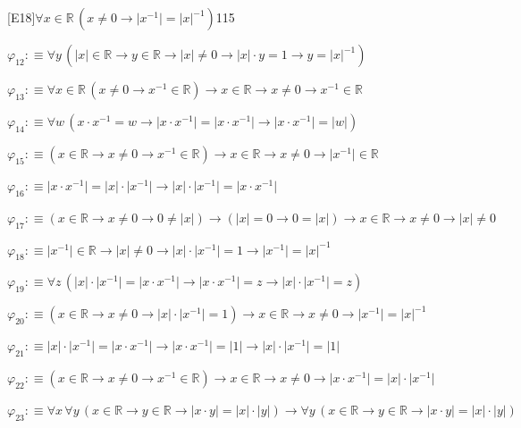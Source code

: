 \begin{fullproof}{[E18]}{$\forall x \in \mathbb{R}\,(x \neq 0 \to \lvert x^{-1} \rvert = \lvert x \rvert^{-1})$}{115}
\begin{abbrevlist}
\item $\varphi_{12} :\equiv \forall y\,(\lvert x \rvert \in \mathbb{R} \to y \in \mathbb{R} \to \lvert x \rvert \neq 0 \to \lvert x \rvert \cdot y = 1 \to y = \lvert x \rvert^{-1})$
\item $\varphi_{13} :\equiv \forall x \in \mathbb{R}\,(x \neq 0 \to x^{-1} \in \mathbb{R}) \to x \in \mathbb{R} \to x \neq 0 \to x^{-1} \in \mathbb{R}$
\item $\varphi_{14} :\equiv \forall w\,(x \cdot x^{-1} = w \to \lvert x \cdot x^{-1} \rvert = \lvert x \cdot x^{-1} \rvert \to \lvert x \cdot x^{-1} \rvert = \lvert w \rvert)$
\item $\varphi_{15} :\equiv (x \in \mathbb{R} \to x \neq 0 \to x^{-1} \in \mathbb{R}) \to x \in \mathbb{R} \to x \neq 0 \to \lvert x^{-1} \rvert \in \mathbb{R}$
\item $\varphi_{16} :\equiv \lvert x \cdot x^{-1} \rvert = \lvert x \rvert \cdot \lvert x^{-1} \rvert \to \lvert x \rvert \cdot \lvert x^{-1} \rvert = \lvert x \cdot x^{-1} \rvert$
\item $\varphi_{17} :\equiv (x \in \mathbb{R} \to x \neq 0 \to 0 \neq \lvert x \rvert) \to (\lvert x \rvert = 0 \to 0 = \lvert x \rvert) \to x \in \mathbb{R} \to x \neq 0 \to \lvert x \rvert \neq 0$
\item $\varphi_{18} :\equiv \lvert x^{-1} \rvert \in \mathbb{R} \to \lvert x \rvert \neq 0 \to \lvert x \rvert \cdot \lvert x^{-1} \rvert = 1 \to \lvert x^{-1} \rvert = \lvert x \rvert^{-1}$
\item $\varphi_{19} :\equiv \forall z\,(\lvert x \rvert \cdot \lvert x^{-1} \rvert = \lvert x \cdot x^{-1} \rvert \to \lvert x \cdot x^{-1} \rvert = z \to \lvert x \rvert \cdot \lvert x^{-1} \rvert = z)$
\item $\varphi_{20} :\equiv (x \in \mathbb{R} \to x \neq 0 \to \lvert x \rvert \cdot \lvert x^{-1} \rvert = 1) \to x \in \mathbb{R} \to x \neq 0 \to \lvert x^{-1} \rvert = \lvert x \rvert^{-1}$
\item $\varphi_{21} :\equiv \lvert x \rvert \cdot \lvert x^{-1} \rvert = \lvert x \cdot x^{-1} \rvert \to \lvert x \cdot x^{-1} \rvert = \lvert 1 \rvert \to \lvert x \rvert \cdot \lvert x^{-1} \rvert = \lvert 1 \rvert$
\item $\varphi_{22} :\equiv (x \in \mathbb{R} \to x \neq 0 \to x^{-1} \in \mathbb{R}) \to x \in \mathbb{R} \to x \neq 0 \to \lvert x \cdot x^{-1} \rvert = \lvert x \rvert \cdot \lvert x^{-1} \rvert$
\item $\varphi_{23} :\equiv \forall x\,\forall y\,(x \in \mathbb{R} \to y \in \mathbb{R} \to \lvert x \cdot y \rvert = \lvert x \rvert \cdot \lvert y \rvert) \to \forall y\,(x \in \mathbb{R} \to y \in \mathbb{R} \to \lvert x \cdot y \rvert = \lvert x \rvert \cdot \lvert y \rvert)$

\end{abbrevlist}
\end{fullproof}
